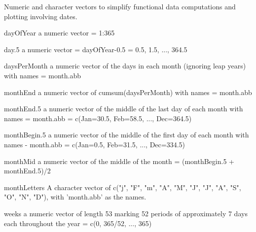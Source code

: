 \begin{Description}\relax
Numeric and character vectors to simplify functional data computations
and plotting involving dates.
\end{Description}
\begin{Format}\relax
\item[dayOfYear] a numeric vector = 1:365 

\item[day.5 ] a numeric vector = dayOfYear-0.5 = 0.5, 1.5, ..., 364.5 

\item[daysPerMonth] a numeric vector of the days in each month (ignoring leap years)
with names = month.abb

\item[monthEnd] a numeric vector of cumsum(daysPerMonth) with names = month.abb

\item[monthEnd.5] a numeric vector of the middle of the last day of each month with
names = month.abb = c(Jan=30.5, Feb=58.5, ..., Dec=364.5)

\item[monthBegin.5] a numeric vector of the middle of the first day of each month with
names - month.abb = c(Jan=0.5, Feb=31.5, ..., Dec=334.5) 

\item[monthMid] a numeric vector of the middle of the month = (monthBegin.5 +
monthEnd.5)/2  

\item[monthLetters] A character vector of c("j", "F", "m", "A", "M", "J", "J", "A",
"S", "O", "N", "D"), with 'month.abb' as the names.  

\item[weeks] a numeric vector of length 53 marking 52 periods of approximately 7
days each throughout the year = c(0, 365/52, ..., 365)
\end{Format}

